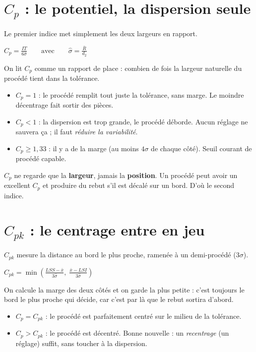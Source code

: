 \documentclass[11pt]{article}
\begin{document}
\section{$C_p$ : le potentiel, la dispersion seule}

Le premier indice met simplement les deux largeurs en rapport.
\begin{formulebox}
$\displaystyle C_p = \frac{IT}{6\hat{\sigma}} \qquad\text{avec}\qquad \hat{\sigma} = \frac{\bar{R}}{d_2}$
\end{formulebox}
On lit $C_p$ comme un rapport de place : combien de fois la largeur naturelle du procédé tient dans la tolérance.
\begin{itemize}
\item $C_p = 1$ : le procédé remplit tout juste la tolérance, sans marge. Le moindre décentrage fait sortir des pièces.
\item $C_p < 1$ : la dispersion est trop grande, le procédé déborde. Aucun réglage ne sauvera ça ; il faut \emph{réduire la variabilité}.
\item $C_p \ge 1{,}33$ : il y a de la marge (au moins $4\sigma$ de chaque côté). Seuil courant de procédé capable.
\end{itemize}
\begin{cle}
$C_p$ ne regarde que la \textbf{largeur}, jamais la \textbf{position}. Un procédé peut avoir un excellent $C_p$ et produire du rebut s'il est décalé sur un bord. D'où le second indice.
\end{cle}

\section{$C_{pk}$ : le centrage entre en jeu}

$C_{pk}$ mesure la distance au bord le plus proche, ramenée à un demi-procédé ($3\sigma$).
\begin{formulebox}
$\displaystyle C_{pk} = \min\!\left(\frac{LSS-\bar{x}}{3\hat{\sigma}},\;\frac{\bar{x}-LSI}{3\hat{\sigma}}\right)$
\end{formulebox}
On calcule la marge des deux côtés et on garde la plus petite : c'est toujours le bord le plus proche qui décide, car c'est par là que le rebut sortira d'abord.
\begin{itemize}
\item $C_p = C_{pk}$ : le procédé est parfaitement centré sur le milieu de la tolérance.
\item $C_p > C_{pk}$ : le procédé est décentré. Bonne nouvelle : un \emph{recentrage} (un réglage) suffit, sans toucher à la dispersion.
\end{itemize}
\end{document}

